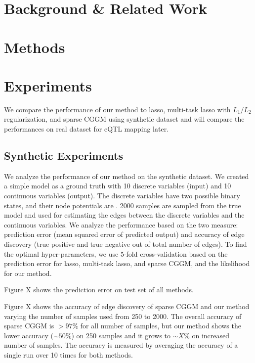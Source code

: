 \documentclass{article}
\begin{document}
\section{Background \& Related Work}
\label{LiteratureReview}

\section{Methods}

\section{Experiments}
We compare the performance of our method to lasso, multi-task lasso with $L_1/L_2$ regularization, and sparse CGGM using synthetic dataset and will compare the performances on real dataset for eQTL mapping later.

\subsection{Synthetic Experiments}
We analyze the performance of our method on the synthetic dataset. We created a simple model as a ground truth with 10 discrete variables (input) and 10 continuous variables (output). The discrete variables have two possible binary states, and their node potentials are . 2000 samples are sampled from the true model and used for estimating the edges between the discrete variables and the continuous variables. We analyze the performance based on the two measure: prediction error (mean squared error of predicted output) and accuracy of edge discovery (true positive and true negative out of total number of edges). To find the optimal hyper-parameters, we use 5-fold cross-validation based on the prediction error for lasso, multi-task lasso, and sparse CGGM, and the likelihood for our method.

Figure X shows the prediction error on test set of all methods.

Figure X shows the accuracy of edge discovery of sparse CGGM and our method varying the number of samples used from 250 to 2000. The overall accuracy of sparse CGGM is $> 97\%$ for all number of samples, but our method shows the lower accuracy ($\sim 50\%$) on 250 samples and it grows to $\sim X\%$ on increased number of samples. The accuracy is measured by averaging the accuracy of a single run over 10 times for both methods.
\end{document}

